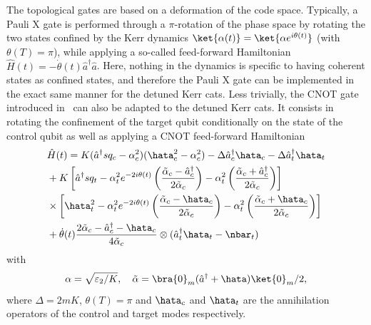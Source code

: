The topological gates are based on a deformation of the code space. Typically,  a Pauli X gate is performed through a $\pi$-rotation of the phase space by rotating the two states confined by the Kerr dynamics $\ket{\alpha(t)} = \ket{\alpha e^{i \theta(t)}}$ (with $\theta(T)=\pi$), while applying a so-called feed-forward Hamiltonian ${\hat H(t)=-\dot\theta(t) \hat a^\dagger \hat a}$. Here, nothing in the dynamics is specific to having coherent states as confined states, and therefore the Pauli X gate can be implemented in the exact same manner for the detuned Kerr cats. Less trivially, the CNOT gate introduced in~\cite{Puri2020} can also be adapted to the detuned Kerr cats. It consists in rotating the confinement of the target qubit conditionally on the state of the control qubit as well as applying a CNOT feed-forward Hamiltonian
\begin{equation}
    \begin{split}
        &\hat H(t) = K(\hat{a}^{\dagger}sq_c - \alpha_c^2)(\hata^2_c - \alpha_c^2) - \Delta \hat{a}^{\dagger}_c \hata_c - \Delta \hat{a}^{\dagger}_t \hata_t \\
        &+ K\left[\hat{a}^{\dagger}sq_t - \alpha^2_t e^{-2 i \theta(t)} \left(\frac{\tilde{\alpha}_c - \hat{a}^{\dagger}_c}{2\tilde \alpha_c}\right) - \alpha_t^2 \left(\frac{\tilde{\alpha}_c + \hat{a}^{\dagger}_c}{2\tilde\alpha_c}\right) \right] \\ 
        &\times \left[\hata^2_t  - \alpha^2_t e^{-2 i \theta(t)} \left(\frac{\tilde{\alpha}_c - \hata_c}{2\tilde\alpha_c}\right) - \alpha_t^2 \left(\frac{\tilde{\alpha}_c + \hata_c}{2\tilde\alpha_c}\right) \right] \\
        &+ \dot\theta(t) \frac{2 \tilde{\alpha}_c - \hat{a}^{\dagger}_c - \hata_c}{4 \tilde\alpha_c} \otimes (\hat{a}^{\dagger}_t \hata_t - \nbar_t) 
        \label{eq:cnot-drive}
    \end{split}
\end{equation}
with
\begin{equation}
        \alpha = \sqrt{\varepsilon_2/K}, \quad
        \tilde{\alpha} = {\bra{0}}_m(\hat{a}^{\dagger}+\hata)\ket{0}_m/2,
\end{equation}
where $\Delta=2mK$, $\theta(T) = \pi$ and $\hata_c$ and $\hata_t$ are the annihilation operators of the control and target modes respectively. 

